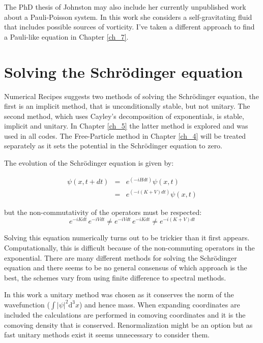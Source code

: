 The PhD thesis of Johnston may also include her currently unpublished work about a Pauli-Poisson system. In this work she considers a self-gravitating fluid that includes possible sources of vorticity. I've taken a different approach to find a Pauli-like equation in Chapter \ref{ch_7}.


\section{Solving the Schr\"odinger equation}
Numerical Recipes \citep{bib_nr} suggests two methods of solving the Schr\"odinger equation, the first is an implicit method, that is unconditionally stable, but not unitary. The second method, which uses Cayley's decomposition of exponentials, is stable, implicit and unitary. In Chapter \ref{ch_5} the latter method is explored and was used in all codes. The Free-Particle method in Chapter \ref{ch_4} will be treated separately as it sets the potential in the Schr\"odinger equation to zero.

The evolution of the Schr\"odinger equation is given by:

\begin{eqnarray}
\label{sch_solve}
\psi(x, t+dt) &=& e^{(-iHdt)} \psi(x, t) \\
	&=& e^{(-i(K+V)dt)} \psi(x, t)
\end{eqnarray}

\noindent but the non-commutativity of the operators must be respected:
\begin{equation}
e^{-i K dt}\, e^{-i V dt} \ne e^{-i V dt}\, e^{-i K dt} \ne e^{-i(K+V)dt}
\end{equation}

Solving this equation numerically turns out to be trickier than it first appears. Computationally, this is difficult because of the non-commuting operators in the exponential. There are many different methods for solving the Schr\"odinger equation and there seems to be no general consensus of which approach is the best, the schemes vary from using finite difference to spectral methods.

In this work a unitary method was chosen as it conserves the norm of the wavefunction ($\int |\psi|^2 \mathrm{d}^3x$) and hence mass. When expanding coordinates are included the calculations are performed in comoving coordinates and it is the comoving density that is conserved. Renormalization might be an option but as fast unitary methods exist it seems unnecessary to consider them.

